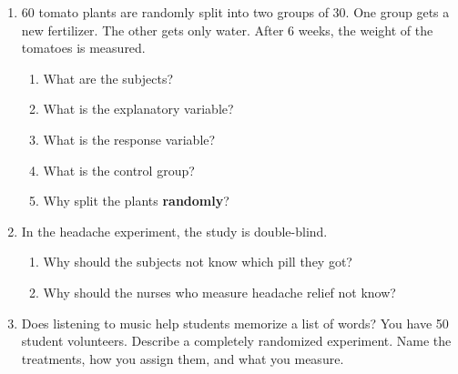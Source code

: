 \documentclass[11pt]{article}
\begin{document}
\newpage
\begin{enumerate}

\item 60 tomato plants are randomly split into two groups of 30. One group gets a new fertilizer. The other gets only water. After 6 weeks, the weight of the tomatoes is measured.
\begin{enumerate}[itemsep=1.4em]
  \item What are the subjects? 
  \item What is the explanatory variable? 
  \item What is the response variable? 
  \item What is the control group? 
  \item Why split the plants \textbf{randomly}? 
\end{enumerate}
\work{2em}

\item In the headache experiment, the study is double-blind.
\begin{enumerate}[itemsep=1em]
  \item Why should the subjects not know which pill they got?

  \work{2.5em}
  \item Why should the nurses who measure headache relief not know?

\end{enumerate}

\newpage
\item Does listening to music help students memorize a list of words? You have 50 student volunteers.
Describe a completely randomized experiment. Name the treatments, how you assign them, and what you measure.

\work{12em}


\end{enumerate}
\end{document}
